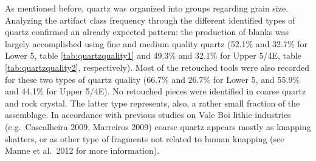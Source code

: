 \documentclass[12pt,twoside]{reedthesis}
\begin{document}
As mentioned before, quartz was organized into groups regarding grain size. Analyzing the artifact class frequency through the different identified types of quartz confirmed an already expected pattern: the production of blanks was largely accomplished using fine and medium quality quartz (52.1\% and 32.7\% for Lower 5, table \ref{tab:quartzquality1} and 49.3\% and 32.1\% for Upper 5/4E, table \ref{tab:quartzquality2}, respectively). Most of the retouched tools were also recorded for these two types of quartz quality (66.7\% and 26.7\% for Lower 5, and 55.9\% and 44.1\% for Upper 5/4E). No retouched pieces were identified in coarse quartz and rock crystal. The latter type represents, also, a rather small fraction of the assemblage. In accordance with previous studies on Vale Boi lithic industries (e.g.~Cascalheira 2009, Marreiros 2009) coarse quartz appears mostly as knapping shatters, or as other type of fragments not related to human knapping (see Manne et al.~2012 for more information).
\begin{table}

\caption{\label{tab:quartzquality1}Vale Boi - Lower 5. Frequencies of technological classes by quartz quality.}
\centering
{}
\end{table}
\begin{table}

\caption{\label{tab:quartzquality2}Vale Boi - Upper 5/4E. Frequencies of technological classes by quartz quality.}
\centering
{}
\end{table}
\end{document}
